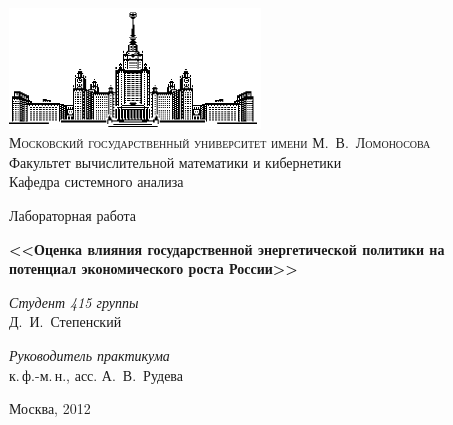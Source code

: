 \documentclass[10pt, a4paper]{article}
\begin{document}
\thispagestyle{empty}

\begin{center}
\ \vspace{-3cm}

\includegraphics[width=0.5\textwidth]{msu.eps}\\
{\scshape Московский государственный университет имени М.~В.~Ломоносова}\\
Факультет вычислительной математики и кибернетики\\
Кафедра системного анализа



\vfill
{\LARGE Лабораторная работа}

\vspace{1cm}

{\huge\bfseries <<Оценка влияния государственной энергетической политики на потенциал экономического роста России>>}
\end{center}

\vspace{2cm}

\begin{flushright}
  \large
  \textit{Студент 415 группы}\\
  Д.~И.~Степенский

  \vspace{5mm}

  \textit{Руководитель практикума}\\
  к.\,ф.-м.\,н., асс. А.~В.~Рудева
\end{flushright}

\vfill

\begin{center}
Москва, 2012
\end{center}

\newpage

\tableofcontents

\newpage
\end{document}
